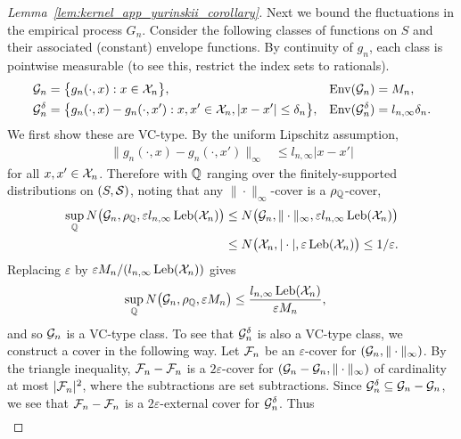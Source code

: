 \begin{proof}[Lemma~\ref{lem:kernel_app_yurinskii_corollary}]
  Next we bound the fluctuations in
  the empirical process $G_n$.
  Consider the following classes of functions on $S$
  and their associated (constant) envelope functions.
  By continuity of $g_n$,
  each class is pointwise measurable
  (to see this, restrict the index sets to rationals).
  \begin{align*}
    \mathcal{G}_n
    &=
    \big\{
      g_n(\cdot, x):
      x \in \mathcal{X}_n
    \big\},
    &\operatorname{Env}(\mathcal{G}_n)
    &=
    M_n, \\
    \mathcal{G}_n^\delta
    &=
    \big\{
      g_n(\cdot, x)
      - g_n(\cdot, x'):
      x, x' \in \mathcal{X}_n,
      |x-x'| \leq \delta_n
    \big\},
    &\operatorname{Env}(\mathcal{G}_n^\delta)
    &=
    l_{n,\infty} \delta_n.
  \end{align*}
  We first show these are VC-type.
  By the uniform Lipschitz assumption,
  \begin{align*}
    \big\|
    g_n(\cdot, x)
    - g_n(\cdot, x')
    \big\|_\infty
    &\leq l_{n,\infty} |x-x'|
  \end{align*}
  for all $x,x' \in \mathcal{X}_n$.
  Therefore with $\mathbb{Q}$ ranging over the
  finitely-supported distributions
  on $(S, \mathcal{S})$,
  noting that any $\|\cdot\|_\infty$-cover
  is a $\rho_{\mathbb{Q}}$-cover,
  \begin{align*}
    \sup_{\mathbb{Q}}
    N\big(\mathcal{G}_n, \rho_{\mathbb{Q}}, \varepsilon l_{n,\infty} \operatorname{Leb}(\mathcal{X}_n)\big)
    &\leq
    N\big(\mathcal{G}_n, \|\cdot\|_\infty,
    \varepsilon l_{n,\infty} \operatorname{Leb}(\mathcal{X}_n)\big) \\
    &\leq
    N\big(\mathcal{X}_n, |\cdot|, \varepsilon \operatorname{Leb}(\mathcal{X}_n)\big)
    \leq
    1/\varepsilon.
  \end{align*}
  Replacing $\varepsilon$ by
  $\varepsilon M_n/(l_{n,\infty} \operatorname{Leb}(\mathcal{X}_n))$
  gives
  \begin{align*}
    \sup_{\mathbb{Q}}
    N\big(\mathcal{G}_n, \rho_{\mathbb{Q}}, \varepsilon M_n \big)
    &\leq
    \frac{l_{n,\infty} \operatorname{Leb}(\mathcal{X}_n)}{\varepsilon M_n},
  \end{align*}
  and so $\mathcal{G}_n$
  is a VC-type class.
  To see that $\mathcal{G}_n^\delta$
  is also a VC-type class,
  we construct a cover in the following way.
  Let $\mathcal{F}_n$ be an $\varepsilon$-cover
  for $(\mathcal{G}_n, \|\cdot\|_\infty)$.
  By the triangle inequality,
  $\mathcal{F}_n - \mathcal{F}_n$ is a $2\varepsilon$-cover
  for $(\mathcal{G}_n - \mathcal{G}_n, \|\cdot\|_\infty)$
  of cardinality at most $|\mathcal{F}_n|^2$,
  where the subtractions are set subtractions.
  Since $\mathcal{G}_n^\delta \subseteq \mathcal{G}_n - \mathcal{G}_n$,
  we see that $\mathcal{F}_n - \mathcal{F}_n$ is a $2\varepsilon$-external cover
  for $\mathcal{G}_n^\delta$. Thus
  \begin{align*}

\end{align*}
\end{proof}
